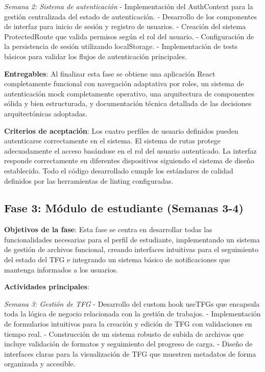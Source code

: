\documentclass[12pt,a4paper,oneside]{report}
\begin{document}
\emph{Semana 2: Sistema de autenticación} - Implementación del AuthContext para la gestión centralizada del estado de autenticación. - Desarrollo de los componentes de interfaz para inicio de sesión y registro de usuarios. - Creación del sistema ProtectedRoute que valida permisos según el rol del usuario. - Configuración de la persistencia de sesión utilizando localStorage. - Implementación de tests básicos para validar los flujos de autenticación principales.

\textbf{Entregables}: Al finalizar esta fase se obtiene una aplicación React completamente funcional con navegación adaptativa por roles, un sistema de autenticación mock completamente operativo, una arquitectura de componentes sólida y bien estructurada, y documentación técnica detallada de las decisiones arquitectónicas adoptadas.

\textbf{Criterios de aceptación}: Los cuatro perfiles de usuario definidos pueden autenticarse correctamente en el sistema. El sistema de rutas protege adecuadamente el acceso basándose en el rol del usuario autenticado. La interfaz responde correctamente en diferentes dispositivos siguiendo el sistema de diseño establecido. Todo el código desarrollado cumple los estándares de calidad definidos por las herramientas de linting configuradas.

\subsection{Fase 3: Módulo de estudiante (Semanas
3-4)}\label{fase-3-muxf3dulo-de-estudiante-semanas-3-4}

\textbf{Objetivos de la fase}: Esta fase se centra en desarrollar todas las funcionalidades necesarias para el perfil de estudiante, implementando un sistema de gestión de archivos funcional, creando interfaces intuitivas para el seguimiento del estado del TFG e integrando un sistema básico de notificaciones que mantenga informados a los usuarios.

\textbf{Actividades principales}:

\emph{Semana 3: Gestión de TFG} - Desarrollo del custom hook useTFGs que encapsula toda la lógica de negocio relacionada con la gestión de trabajos. - Implementación de formularios intuitivos para la creación y edición de TFG con validaciones en tiempo real. - Construcción de un sistema robusto de subida de archivos que incluye validación de formatos y seguimiento del progreso de carga. - Diseño de interfaces claras para la visualización de TFG que muestren metadatos de forma organizada y accesible.
\end{document}
